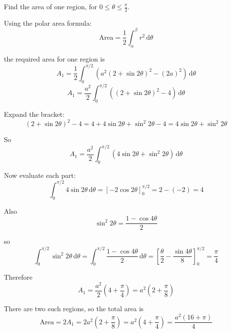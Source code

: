 \documentclass[leqno]{article}
\begin{document}
\begin{enumerate}[
	  label=\textbf{\arabic*.},
	  leftmargin=*,
	  topsep=0pt,
	  partopsep=0pt,
	  parsep=0pt
	]
\begin{djsSolution}
\begin{enumerate}[label=\textbf{(\alph*)}]
	  Find the area of one region, for $0\le \theta \le \frac{\pi}{2}$.
	
	  Using the polar area formula:
	  \[
	  \text{Area}=\frac12\int_{\alpha}^{\beta} r^2\,\mathrm{d}\theta
	  \]

	  the required area for one region is
	  \[
	  A_1=\frac12\int_0^{\pi/2}\left(a^2(2+\sin 2\theta)^2-(2a)^2\right)\,\mathrm{d}\theta
	  \]
	  \[
	  A_1=\frac{a^2}{2}\int_0^{\pi/2}\left((2+\sin 2\theta)^2-4\right)\,\mathrm{d}\theta
	  \]
	
	  Expand the bracket:
	  \[
	  (2+\sin 2\theta)^2-4
	  =4+4\sin 2\theta+\sin^2 2\theta-4
	  =4\sin 2\theta+\sin^2 2\theta
	  \]
	
	  So
	  \[
	  A_1=\frac{a^2}{2}\int_0^{\pi/2}\left(4\sin 2\theta+\sin^2 2\theta\right)\,\mathrm{d}\theta
	  \]
	
	  Now evaluate each part:
	  \[
	  \int_0^{\pi/2}4\sin 2\theta\,\mathrm{d}\theta
	  =\left[-2\cos 2\theta\right]_0^{\pi/2}
	  =2-(-2)=4
	  \]
	
	  Also
	  \[
	  \sin^2 2\theta=\frac{1-\cos 4\theta}{2}
	  \]

	  so
	  \[
	  \int_0^{\pi/2}\sin^2 2\theta\,\mathrm{d}\theta
	  =\int_0^{\pi/2}\frac{1-\cos 4\theta}{2}\,\mathrm{d}\theta
	  =\left[\frac{\theta}{2}-\frac{\sin 4\theta}{8}\right]_0^{\pi/2}
	  =\frac{\pi}{4}
	  \]
	
	  Therefore
	  \[
	  A_1=\frac{a^2}{2}\left(4+\frac{\pi}{4}\right)
	  =a^2\left(2+\frac{\pi}{8}\right)
	  \]
	
	  There are two such regions, so the total area is
	  \[
	  \text{Area}=2A_1=2a^2\left(2+\frac{\pi}{8}\right)
	  =a^2\left(4+\frac{\pi}{4}\right)
	  =\frac{a^2(16+\pi)}{4}
	  \]
	\end{enumerate}
	\end{djsSolution}
	
	
	\newpage
	
\questionitem

\begin{figure}[H]
    \centering
{}
\end{figure}
\end{enumerate}
\end{document}
